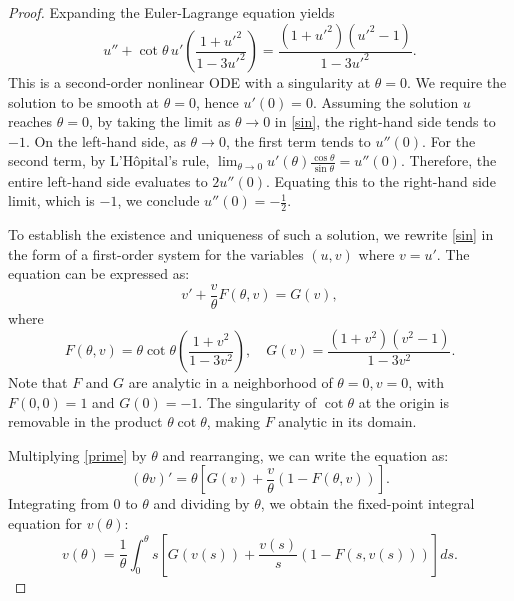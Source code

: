 \documentclass[10pt,a4paper]{amsart}
\begin{document}
\begin{proof}
Expanding the Euler-Lagrange equation yields
\begin{equation} \label{sin}
 u'' + \cot\theta \, u' \left( \frac{1+u'^2}{1-3u'^2} \right) = \frac{(1+u'^2)(u'^2-1)}{1-3u'^2} .
\end{equation}
This is a second-order nonlinear ODE with a singularity at $\theta = 0$. We require the solution to be smooth at $\theta=0$, hence $u'(0) = 0$. Assuming the solution $u$ reaches $\theta=0$, by taking the limit as $\theta \to 0$ in \eqref{sin}, the right-hand side tends to $-1$. On the left-hand side, as $\theta \to 0$, the first term tends to $u''(0)$. 
For the second term, by L'H\^{o}pital's rule, $\lim_{\theta \to 0} u'(\theta)\frac{\cos\theta}{\sin\theta} = u''(0)$. Therefore, 
the entire left-hand side evaluates to $2u''(0)$. Equating this to 
the right-hand side limit, which is $-1$, we conclude $u''(0) =- \frac12$.
 
 To establish the existence and uniqueness of such a solution, we rewrite \eqref{sin} in the form of a first-order system for the variables $(u, v)$ where $v = u'$. The equation can be expressed as:
\begin{equation} \label{prime}
 v' + \frac{v}{\theta} F(\theta, v) = G(v),
\end{equation}
where 
$$F(\theta, v) = \theta \cot \theta \left( \frac{1+v^2}{1-3v^2} \right),\quad G(v) = \frac{(1+v^2)(v^2-1)}{1-3v^2}.$$
 Note that $F$ and $G$ are analytic in a neighborhood of $\theta = 0, v = 0$, with $F(0, 0) = 1$ and $G(0) = -1$. The singularity of $\cot \theta$ at the origin is removable in the product $\theta \cot \theta$, making $F$ analytic in its domain.


Multiplying \eqref{prime} by $\theta$ and rearranging, we can write the equation as:
\begin{equation*}
 (\theta v)' = \theta \left[ G(v) + \frac{v}{\theta} (1 - F(\theta, v)) \right].
\end{equation*}
Integrating from $0$ to $\theta$ and dividing by $\theta$, we obtain the fixed-point integral equation for $v(\theta)$:
\begin{equation} \label{ope}
 v(\theta) = \frac{1}{\theta} \int_0^\theta s \left[ G(v(s)) + \frac{v(s)}{s} (1 - F(s, v(s))) \right] ds.
\end{equation}
 

\end{proof}
\end{document}
